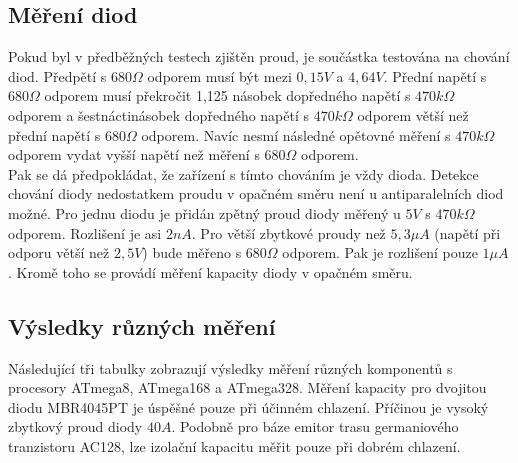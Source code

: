 \subsection{Měření diod}
\label{sec:diode}
Pokud byl v předběžných testech zjištěn proud, je součástka testována na chování diod.
Předpětí s \(680\Omega\) odporem musí být mezi \(0,15V\) a \(4,64V\).
Přední napětí s \(680\Omega\) odporem musí překročit 1,125 násobek dopředného napětí
s \(470k\Omega\) odporem a šestnáctinásobek dopředného napětí s \(470k\Omega\) odporem
větší než přední napětí s \(680\Omega\) odporem.
Navíc nesmí následné opětovné měření s \(470k\Omega\) odporem vydat vyšší napětí
než měření s \(680\Omega\) odporem.\\
Pak se dá předpokládat, že zařízení s tímto chováním je vždy dioda.
Detekce chování diody nedostatkem proudu v opačném směru není u antiparalelních diod možné.
Pro jednu diodu je přidán zpětný proud diody měřený u \(5V\) s \(470k\Omega\) odporem.
Rozlišení je asi \(2nA\). Pro větší zbytkové proudy než \(5,3\mu A\)
(napětí při odporu větší než \(2,5V\)) bude měřeno s \(680\Omega\) odporem.
Pak je rozlišení pouze \(1\mu A\).
Kromě toho se provádí měření kapacity diody v opačném směru. 

\subsection{Výsledky různých měření}
Následující tři tabulky zobrazují výsledky měření různých komponentů s procesory ATmega8, ATmega168 a ATmega328.
Měření kapacity pro dvojitou diodu MBR4045PT je úspěšné pouze při účinném chlazení.
Příčinou je vysoký zbytkový proud diody \(40A\).
Podobně pro báze emitor trasu germaniového tranzistoru AC128, lze izolační kapacitu
měřit pouze při dobrém chlazení. 

